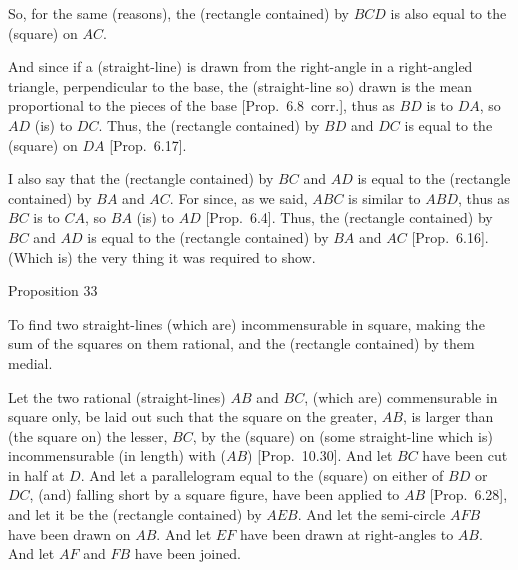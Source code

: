 So, for the same (reasons), the (rectangle contained) by $BCD$
is also equal to the (square) on $AC$.

And since if a (straight-line) is drawn from the right-angle in a right-angled
triangle,  perpendicular to the base, the (straight-line so) drawn
is the mean proportional to the pieces of the base [Prop.~6.8~corr.], thus as $BD$ is to $DA$, so $AD$ (is) to $DC$. Thus, the (rectangle contained) by
$BD$ and $DC$ is equal to the (square) on $DA$ [Prop.~6.17]. 

I also say that the (rectangle contained) by $BC$ and
$AD$ is equal to the (rectangle contained) by $BA$ and $AC$.
For since,  as we said, $ABC$ is similar to $ABD$, thus as $BC$
is to $CA$, so $BA$ (is) to $AD$ [Prop.~6.4].
Thus, the (rectangle contained) by $BC$ and $AD$
is equal to the (rectangle contained) by $BA$ and $AC$ [Prop.~6.16].
(Which is) the very thing it was required to show.


\begin{center}
{\large Proposition 33}
\end{center}

To find two straight-lines (which are) incommensurable
in square, making the sum of the squares on them rational, and the (rectangle contained) by them medial.

Let the two rational (straight-lines) $AB$ and $BC$, (which are) commensurable in square only, be laid out such that the square on the greater, $AB$, is larger
than (the square on) the lesser, $BC$, by the (square) on (some straight-line which is) incommensurable (in length)
with ($AB$) [Prop.~10.30]. And let $BC$ have been
cut in half at $D$. And let a parallelogram equal to the (square) on
either of $BD$ or $DC$, (and) falling short by a square figure, have
been applied to $AB$ [Prop.~6.28], and
let it be the (rectangle contained) by $AEB$. And let the semi-circle
$AFB$ have been drawn on $AB$. And let $EF$ have been
drawn at right-angles to $AB$. And let $AF$ and $FB$ have been joined.

\centerline{}

